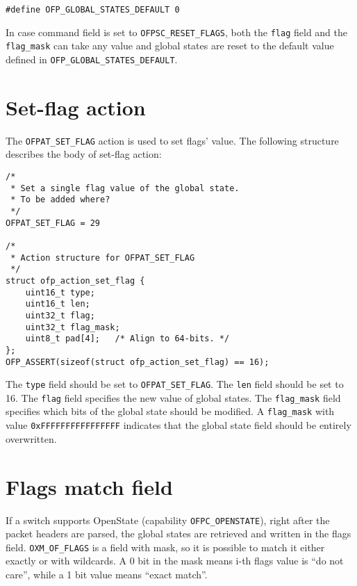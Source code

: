 \begin{verbatim}
#define OFP_GLOBAL_STATES_DEFAULT 0
\end{verbatim}

In case command field is set to \texttt{OFPSC\_RESET\_FLAGS}, both the \texttt{flag} field and the \texttt{flag\_mask} can take any value and global states are reset to the default value defined in \texttt{OFP\_GLOBAL\_STATES\_DEFAULT}.




\section{Set-flag action}
\label{sec:set_flag_action_proto}

The \texttt{OFPAT\_SET\_FLAG} action is used to set flags' value.
The following structure describes the body of set-flag action:

\begin{verbatim}
/*
 * Set a single flag value of the global state.
 * To be added where?
 */
OFPAT_SET_FLAG = 29

/*
 * Action structure for OFPAT_SET_FLAG
 */
struct ofp_action_set_flag {
    uint16_t type;
    uint16_t len; 
    uint32_t flag;
    uint32_t flag_mask;   
    uint8_t pad[4];   /* Align to 64-bits. */
};
OFP_ASSERT(sizeof(struct ofp_action_set_flag) == 16);
\end{verbatim}

The \texttt{type} field should be set to \texttt{OFPAT\_SET\_FLAG}. The \texttt{len} field should be set to 16. The \texttt{flag} field specifies the new value of global states. The \texttt{flag\_mask} field specifies which bits of the global state should be modified. A \texttt{flag\_mask} with value \texttt{0xFFFFFFFFFFFFFFFF} indicates that the global state field should be entirely overwritten.

\section{Flags match field}
\label{section:oxm_of_flags}

If a switch supports OpenState (capability \texttt{OFPC\_OPENSTATE}), right after the packet headers are parsed, the global states are retrieved and written in the flags field. \texttt{OXM\_OF\_FLAGS} is a field with mask, so it is possible to match it either exactly or with wildcards. A 0 bit in the mask means i-th flags value is ``do not care'', while a 1 bit value means ``exact match''.


